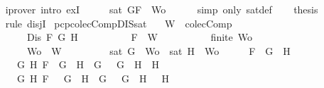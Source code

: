 \begin{isabellebody}
\ \ \ \ \isamarkupfalse%
\ {\isacharparenleft}iprover\ intro{\isacharcolon}\ exI{\isacharparenright}\isanewline
\ \ \isamarkupfalse%
\ \isamarkupfalse%
\ {\isachardoublequoteopen}sat\ {\isacharparenleft}{\isacharbraceleft}G{\isacharcomma}F{\isacharbraceright}\ {\isasymunion}\ Wo{\isacharparenright}{\isachardoublequoteclose}\isanewline
\ \ \ \ \isamarkupfalse%
\ {\isacharparenleft}simp\ only{\isacharcolon}\ sat{\isacharunderscore}def{\isacharparenright}\isanewline
\ \ \isamarkupfalse%
\ {\isacharquery}thesis\isanewline
\ \ \ \ \isamarkupfalse%
\ {\isacharparenleft}rule\ disjI{}{\isacharparenright}\isanewline
{}\isamarkupfalse%
%
\endisatagproof
{\isafoldproof}%
%
\isadelimproof
\isanewline
%
\endisadelimproof
\isanewline
{}\isamarkupfalse%
\ pcp{\isacharunderscore}colecComp{\isacharunderscore}DIS{\isacharunderscore}sat{\isacharcolon}\isanewline
\ \ \ {\isachardoublequoteopen}W\ {\isasymin}\ colecComp{\isachardoublequoteclose}\isanewline
\ \ \ \ \ \ \ \ \ \ {\isachardoublequoteopen}Dis\ F\ G\ H{\isachardoublequoteclose}\isanewline
\ \ \ \ \ \ \ \ \ \ {\isachardoublequoteopen}F\ {\isasymin}\ W{\isachardoublequoteclose}\isanewline
\ \ \ \ \ \ \ \ \ \ {\isachardoublequoteopen}finite\ Wo{\isachardoublequoteclose}\isanewline
\ \ \ \ \ \ \ \ \ \ {\isachardoublequoteopen}Wo\ {\isasymsubseteq}\ W{\isachardoublequoteclose}\isanewline
\ \ \ \ \ \ \ \ \ {\isachardoublequoteopen}sat\ {\isacharparenleft}{\isacharbraceleft}G{\isacharbraceright}\ {\isasymunion}\ Wo{\isacharparenright}\ {\isasymor}\ sat\ {\isacharparenleft}{\isacharbraceleft}H{\isacharbraceright}\ {\isasymunion}\ Wo{\isacharparenright}{\isachardoublequoteclose}\isanewline
%
\isadelimproof
%
\endisadelimproof
%
\isatagproof
{}\isamarkupfalse%
\ {\isacharminus}\isanewline
\ \ \isamarkupfalse%
\ {\isachardoublequoteopen}{\isacharparenleft}F\ {\isacharequal}\ G\ \isactrlbold {\isasymor}\ H\ {\isasymor}\ \isanewline
\ \ \ \ \ \ \ \ {\isacharparenleft}{\isasymexists}G{}\ H{}{\isachardot}\ F\ {\isacharequal}\ G{}\ \isactrlbold {\isasymrightarrow}\ H{}\ {\isasymand}\ G\ {\isacharequal}\ \isactrlbold {\isasymnot}\ G{}\ {\isasymand}\ H\ {\isacharequal}\ H{}{\isacharparenright}\ {\isasymor}\ \isanewline
\ \ \ \ \ \ \ \ {\isacharparenleft}{\isasymexists}G{}\ H{}{\isachardot}\ F\ {\isacharequal}\ \isactrlbold {\isasymnot}\ {\isacharparenleft}G{}\ \isactrlbold {\isasymand}\ H{}{\isacharparenright}\ {\isasymand}\ G\ {\isacharequal}\ \isactrlbold {\isasymnot}\ G{}\ {\isasymand}\ H\ {\isacharequal}\ \isactrlbold {\isasymnot}\ H{}{\isacharparenright}\ {\isasymor}\ \isanewline

\end{isabellebody}
